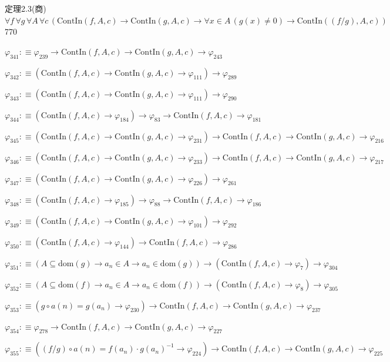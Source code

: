 \begin{fullproof}{定理2.3(商)}{$\forall f\,\forall g\,\forall A\,\forall c\,(\mathrm{ContIn}(f,A,c) \to \mathrm{ContIn}(g,A,c) \to \forall x \in A\,(g(x) \neq 0) \to \mathrm{ContIn}((f / g),A,c))$}{770}
\begin{abbrevlist}
\item $\varphi_{341} :\equiv \varphi_{239} \to \mathrm{ContIn}(f,A,c) \to \mathrm{ContIn}(g,A,c) \to \varphi_{243}$
\item $\varphi_{342} :\equiv (\mathrm{ContIn}(f,A,c) \to \mathrm{ContIn}(g,A,c) \to \varphi_{111}) \to \varphi_{289}$
\item $\varphi_{343} :\equiv (\mathrm{ContIn}(f,A,c) \to \mathrm{ContIn}(g,A,c) \to \varphi_{111}) \to \varphi_{290}$
\item $\varphi_{344} :\equiv (\mathrm{ContIn}(f,A,c) \to \varphi_{184}) \to \varphi_{83} \to \mathrm{ContIn}(f,A,c) \to \varphi_{181}$
\item $\varphi_{345} :\equiv (\mathrm{ContIn}(f,A,c) \to \mathrm{ContIn}(g,A,c) \to \varphi_{231}) \to \mathrm{ContIn}(f,A,c) \to \mathrm{ContIn}(g,A,c) \to \varphi_{216}$
\item $\varphi_{346} :\equiv (\mathrm{ContIn}(f,A,c) \to \mathrm{ContIn}(g,A,c) \to \varphi_{233}) \to \mathrm{ContIn}(f,A,c) \to \mathrm{ContIn}(g,A,c) \to \varphi_{217}$
\item $\varphi_{347} :\equiv (\mathrm{ContIn}(f,A,c) \to \mathrm{ContIn}(g,A,c) \to \varphi_{226}) \to \varphi_{261}$
\item $\varphi_{348} :\equiv (\mathrm{ContIn}(f,A,c) \to \varphi_{185}) \to \varphi_{88} \to \mathrm{ContIn}(f,A,c) \to \varphi_{186}$
\item $\varphi_{349} :\equiv (\mathrm{ContIn}(f,A,c) \to \mathrm{ContIn}(g,A,c) \to \varphi_{101}) \to \varphi_{292}$
\item $\varphi_{350} :\equiv (\mathrm{ContIn}(f,A,c) \to \varphi_{144}) \to \mathrm{ContIn}(f,A,c) \to \varphi_{286}$
\item $\varphi_{351} :\equiv (A \subseteq \mathrm{dom}(g) \to a_{n} \in A \to a_{n} \in \mathrm{dom}(g)) \to (\mathrm{ContIn}(f,A,c) \to \varphi_{7}) \to \varphi_{304}$
\item $\varphi_{352} :\equiv (A \subseteq \mathrm{dom}(f) \to a_{n} \in A \to a_{n} \in \mathrm{dom}(f)) \to (\mathrm{ContIn}(f,A,c) \to \varphi_{8}) \to \varphi_{305}$
\item $\varphi_{353} :\equiv (g \circ a(n) = g(a_{n}) \to \varphi_{230}) \to \mathrm{ContIn}(f,A,c) \to \mathrm{ContIn}(g,A,c) \to \varphi_{237}$
\item $\varphi_{354} :\equiv \varphi_{278} \to \mathrm{ContIn}(f,A,c) \to \mathrm{ContIn}(g,A,c) \to \varphi_{227}$
\item $\varphi_{355} :\equiv ((f / g) \circ a(n) = f(a_{n}) \cdot g(a_{n})^{-1} \to \varphi_{224}) \to \mathrm{ContIn}(f,A,c) \to \mathrm{ContIn}(g,A,c) \to \varphi_{225}$

\end{abbrevlist}
\end{fullproof}
